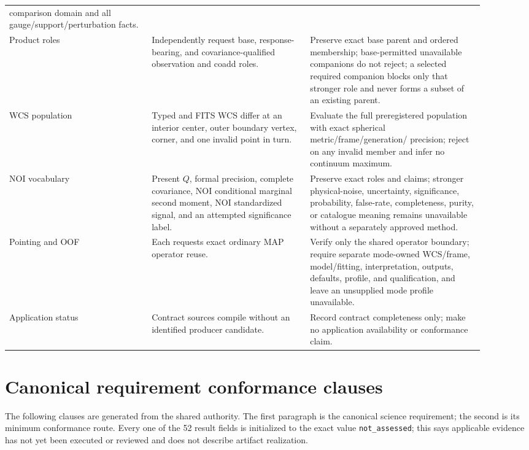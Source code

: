 \documentclass[10pt]{article}
\begin{document}
\begin{longtable}{L{0.27\linewidth}L{0.30\linewidth}L{0.33\linewidth}}
comparison domain and all gauge/support/perturbation facts.\\
Product roles & Independently request base, response-bearing, and
covariance-qualified observation and coadd roles. & Preserve exact base parent
and ordered membership; base-permitted unavailable companions do not reject;
a selected required companion blocks only that stronger role and never forms a
subset of an existing parent.\\
WCS population & Typed and FITS WCS differ at an interior center, outer
boundary vertex, corner, and one invalid point in turn. & Evaluate the full
preregistered population with exact spherical metric/frame/generation/
precision; reject on any invalid member and infer no continuum maximum.\\
NOI vocabulary & Present \(Q\), formal precision, complete covariance, NOI
conditional marginal second moment, NOI standardized signal, and an attempted
significance label. & Preserve exact roles and claims; stronger physical-noise,
uncertainty, significance, probability, false-rate, completeness, purity, or
catalogue meaning remains unavailable without a separately approved method.\\
Pointing and OOF & Each requests exact ordinary MAP operator reuse. & Verify
only the shared operator boundary; require separate mode-owned WCS/frame,
model/fitting, interpretation, outputs, defaults, profile, and qualification,
and leave an unsupplied mode profile unavailable.\\
Application status & Contract sources compile without an identified producer
candidate. & Record contract completeness only; make no application
availability or conformance claim.\\
\bottomrule
\end{longtable}

\SCIMapNOIOwnershipStatement

\clearpage
\section{Canonical requirement conformance clauses}\label{sec:requirements}

The following clauses are generated from the shared authority. The first
paragraph is the canonical science requirement; the second is its minimum
conformance route. Every one of the 52 result fields is initialized to the
exact value \texttt{not\_assessed}; this says applicable evidence has not yet
been executed or reviewed and does not describe artifact realization.
\end{document}
